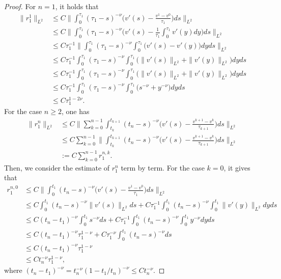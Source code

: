 \documentclass[10pt,a4paper]{amsart}
\begin{document}
\begin{proof}
For $n=1$, it holds that
\begin{align*}
\|r_1^1\|_{L^2}
&\le C\bigg\|\int_0^{\tau_1}(\tau_1-s)^{-\nu}\bigg(v'(s)-\frac{v^1-v^0}{\tau_1}\bigg)ds\bigg\|_{L^2}\\
&\le C\bigg\|\int_0^{\tau_1}(\tau_1-s)^{-\nu}\bigg(v'(s)-\frac{1}{\tau_1}\int_0^{\tau_1}v'(y)dy\bigg)ds\bigg\|_{L^2}\\
&\le C\tau_1^{-1}\bigg\|\int_0^{\tau_1}(\tau_1-s)^{-\nu}\int_0^{\tau_1}\big(v'(s)-v'(y)\big)dyds\bigg\|_{L^2}\\
&\le C\tau_1^{-1}\int_0^{\tau_1}(\tau_1-s)^{-\nu}\int_0^{\tau_1}\big(\|v'(s)\|_{L^2}+\|v'(y)\|_{L^2}\big)dyds\\
&\le C\tau_1^{-1}\int_0^{\tau_1}(\tau_1-s)^{-\nu}\int_0^{\tau_1}\big(\|v'(s)\|_{L^2}+\|v'(y)\|_{L^2}\big)dyds\\
&\le C\tau_1^{-1}\int_0^{\tau_1}(\tau_1-s)^{-\nu}\int_0^{\tau_1}\big(s^{-\nu}+y^{-\nu}\big)dyds\\
&\le C\tau_1^{1-2\nu}.
\end{align*}
For the case $n\geq2$, one has
\begin{align*}
\|r_1^n\|_{L^2}
&\le C\bigg\|\sum_{k=0}^{n-1}\int_{t_k}^{t_{k+1}}(t_n-s)^{-\nu}\bigg(v'(s)-\frac{v^{k+1}-v^k}{\tau_{k+1}}\bigg)ds\bigg\|_{L^2}\\
&\le C\sum_{k=0}^{n-1}\bigg\|\int_{t_k}^{t_{k+1}}(t_n-s)^{-\nu}\bigg(v'(s)-\frac{v^{k+1}-v^k}{\tau_{k+1}}\bigg)ds\bigg\|_{L^2}\\
&:=C\sum_{k=0}^{n-1}r_1^{n,k}.
\end{align*}
Then, we consider the estimate of $r_1^n$ term by term. For the case $k=0$, it gives that
\begin{align*}
r_1^{n,0}
&\le C\bigg\|\int_{0}^{t_1}(t_n-s)^{-\nu}\bigg(v'(s)-\frac{v^1-v^0}{\tau_1}\bigg)ds\bigg\|_{L^2}\\
&\le C\int_{0}^{t_1}(t_n-s)^{-\nu}\|v'(s)\|_{L^2}ds+C\tau_1^{-1}\int_0^{t_1}(t_n-s)^{-\nu}\int_0^{t_1}\|v'(y)\|_{L^2}dyds\\
&\le C(t_n-t_1)^{-\nu}\int_0^{t_1}s^{-\nu}ds+C\tau_1^{-1}\int_0^{t_1}(t_n-s)^{-\nu}\int_0^{t_1}y^{-\nu}dyds\\
&\le C(t_n-t_1)^{-\nu}\tau_1^{1-\nu}+C\tau_1^{-\nu}\int_0^{t_1}(t_n-s)^{-\nu}ds\\
&\le C(t_n-t_1)^{-\nu}\tau_1^{1-\nu}\\
&\le Ct_n^{-\nu}\tau_1^{1-\nu},
\end{align*}
where $(t_n-t_1)^{-\nu}=t_n^{-\nu}(1-t_1/t_n)^{-\nu}\le Ct_n^{-\nu}$.


\end{proof}
\end{document}

